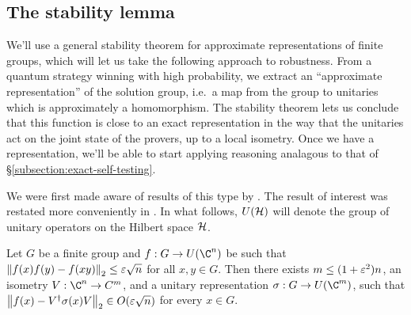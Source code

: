 \subsection{The stability lemma}
\label{subsection:stability-lemma}

We'll use a general stability theorem for approximate representations of finite groups, which will let us take the following approach to robustness. From a quantum strategy winning with high probability, we extract an ``approximate representation'' of the solution group, i.e.\ a map from the group to unitaries which is approximately a homomorphism. The stability theorem lets us conclude that this function is close to an exact representation in the way that the unitaries act on the joint state of the provers, up to a local isometry. Once we have a representation, we'll be able to start applying reasoning analagous to that of \S \ref{subsection:exact-self-testing}. 

We were first made aware of results of this type by \cite{gowers2015inverse}. The result of interest was restated more conveniently in \cite{gowers2017generalizations}. In what follows, $U(\mathcal H)$ will denote the group of unitary operators on the Hilbert space $\mathcal H$. 
\begin{thm}\label{thm:gowers-hatami}
	Let $G$ be a finite group and $f: G\to U(\C^n)$ be such that $\left\Vert f(x)f(y) - f(xy)\right\Vert_2 \leq \varepsilon\sqrt n$ for all $x,y\in G$. Then there exists $m \leq (1+\varepsilon^2)n$, an isometry $V: \C^n\to C^m$, and a unitary representation $\s : G \to U(\C^m)$, such that $\left\Vert f(x) - V^\dagger\sigma(x)V\right\Vert_2 \in O(\varepsilon\sqrt n)$ for every $x\in G$.
\end{thm}

